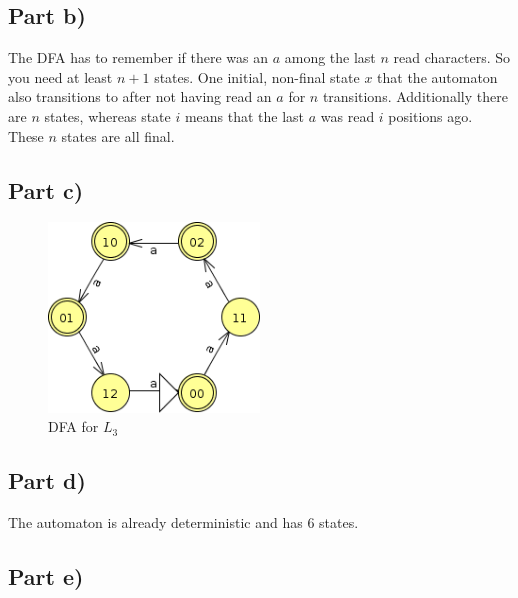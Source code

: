 \documentclass[10pt,a4paper]{article}
\begin{document}
\subsection*{Part b)}

The DFA has to remember if there was an $a$ among the last $n$ read characters.
So you need at least $n + 1$ states.
One initial, non-final state $x$ that the automaton also transitions to after not having read an $a$ for $n$ transitions.
Additionally there are $n$ states, whereas state $i$ means that the last $a$ was read $i$ positions ago.
These $n$ states are all final.

\subsection*{Part c)}

\begin{figure}[h]
  \centering
  \includegraphics[width=0.5\textwidth]{sheet-1/exercise-1-c}
  \caption{DFA for $L_{3}$}
\end{figure}

\subsection*{Part d)}

The automaton is already deterministic and has $6$ states.

\subsection*{Part e)}
\end{document}
